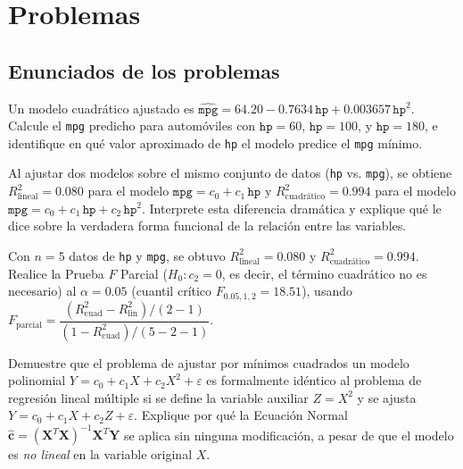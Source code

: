 \section*{Problemas}

\subsection*{Enunciados de los problemas}

\begin{problema}
	\label{prob:85eb17b}
	Un modelo cuadrático ajustado es $\hat{\texttt{mpg}} = 64.20 - 0.7634\,\texttt{hp} + 0.003657\,\texttt{hp}^2$. Calcule el \texttt{mpg} predicho para automóviles con $\texttt{hp}=60$, $\texttt{hp}=100$, y $\texttt{hp}=180$, e identifique en qué valor aproximado de \texttt{hp} el modelo predice el \texttt{mpg} mínimo.
\end{problema}

\begin{problema}
	\label{prob:5afaae8}
	Al ajustar dos modelos sobre el mismo conjunto de datos (\texttt{hp} vs. \texttt{mpg}), se obtiene $R^2_{\text{lineal}}=0.080$ para el modelo $\texttt{mpg}=c_0+c_1\,\texttt{hp}$ y $R^2_{\text{cuadrático}}=0.994$ para el modelo $\texttt{mpg}=c_0+c_1\,\texttt{hp}+c_2\,\texttt{hp}^2$. Interprete esta diferencia dramática y explique qué le dice sobre la verdadera forma funcional de la relación entre las variables.
\end{problema}

\begin{problema}
	\label{prob:e757ebc}
	Con $n=5$ datos de \texttt{hp} y \texttt{mpg}, se obtuvo $R^2_{\text{lineal}}=0.080$ y $R^2_{\text{cuadrático}}=0.994$. Realice la Prueba $F$ Parcial ($H_0:c_2=0$, es decir, el término cuadrático no es necesario) al $\alpha=0.05$ (cuantil crítico $F_{0.05,1,2}=18.51$), usando $F_{\text{parcial}}=\dfrac{(R^2_{\text{cuad}}-R^2_{\text{lin}})/(2-1)}{(1-R^2_{\text{cuad}})/(5-2-1)}$.
\end{problema}

\begin{problema}
	\label{prob:c772cd1}
	Demuestre que el problema de ajustar por mínimos cuadrados un modelo polinomial $Y=c_0+c_1X+c_2X^2+\varepsilon$ es formalmente idéntico al problema de regresión lineal múltiple si se define la variable auxiliar $Z=X^2$ y se ajusta $Y=c_0+c_1X+c_2Z+\varepsilon$. Explique por qué la Ecuación Normal $\hat{\mathbf{c}}=(\mathbf{X}^T\mathbf{X})^{-1}\mathbf{X}^T\mathbf{Y}$ se aplica sin ninguna modificación, a pesar de que el modelo es \emph{no lineal} en la variable original $X$.
\end{problema}

